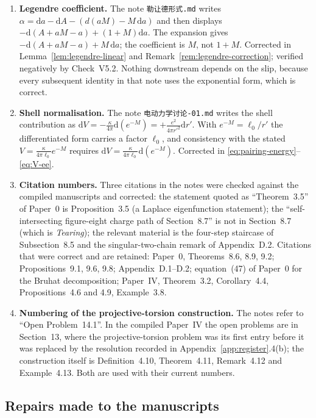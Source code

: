 \begin{enumerate}[label=(\alph*)]
  \item \textbf{Legendre coefficient.}  The note \texttt{勒让德形式.md} writes
  $\alpha=\mathrm da-\mathrm dA-(d(aM)-M\,\mathrm da)$ and then displays
  $-\mathrm d(A+aM-a)+(1+M)\mathrm da$.  The expansion gives
  $-\mathrm d(A+aM-a)+M\,\mathrm da$; the coefficient is $M$, not $1+M$.
  Corrected in Lemma~\ref{lem:legendre-linear} and
  Remark~\ref{rem:legendre-correction}; verified negatively by Check~V5.2.
  Nothing downstream depends on the slip, because every subsequent identity in
  that note uses the exponential form, which is correct.
  \item \textbf{Shell normalisation.}  The note
  \texttt{电动力学讨论-01.md} writes the shell contribution as
  $\mathrm dV=-\frac{\kappa}{4\pi}\mathrm d(e^{-M})=+\frac{e^{2}}{4\pi
  r'^{2}}\mathrm dr'$.  With $e^{-M}=\ell_0/r'$ the differentiated form carries a
  factor $\ell_0$, and consistency with the stated
  $V=\frac{\kappa}{4\pi\ell_0}e^{-M}$ requires
  $\mathrm dV=\frac{\kappa}{4\pi\ell_0}\mathrm d(e^{-M})$.  Corrected in
  \eqref{eq:pairing-energy}--\eqref{eq:V-ee}.
  \item \textbf{Citation numbers.}  Three citations in the notes were checked
  against the compiled manuscripts and corrected: the statement quoted as
  ``Theorem~3.5'' of Paper~0 is Proposition~3.5 (a Laplace eigenfunction
  statement); the ``self-intersecting figure-eight charge path of Section~8.7''
  is not in Section~8.7 (which is \emph{Tearing}); the relevant material is the
  four-step staircase of Subsection~8.5 and the singular-two-chain remark of
  Appendix~D.2.  Citations that were correct and are retained:
  Paper~0, Theorems~8.6, 8.9, 9.2; Propositions~9.1, 9.6, 9.8; Appendix~D.1--D.2;
  equation~(47) of Paper~0 for the Bruhat decomposition; Paper~IV,
  Theorem~3.2, Corollary~4.4, Propositions~4.6 and 4.9, Example~3.8.
  \item \textbf{Numbering of the projective-torsion construction.}  The notes
  refer to ``Open Problem~14.1''.  In the compiled Paper~IV the open problems
  are in Section~13, where the projective-torsion problem was its first entry
  before it was replaced by the resolution recorded in
  Appendix~\ref{app:register}.4(b); the construction itself is
  Definition~4.10, Theorem~4.11, Remark~4.12 and Example~4.13.  Both are used
  with their current numbers.
\end{enumerate}

\subsection{Repairs made to the \AEG{} manuscripts}

